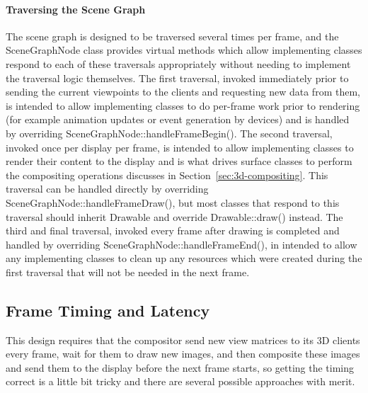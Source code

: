 \paragraph{Traversing the Scene Graph}

The scene graph is designed to be traversed several times per frame, and the SceneGraphNode class provides virtual methods which allow implementing classes respond to each of these traversals appropriately without needing to implement the traversal logic themselves. The first traversal, invoked immediately prior to sending the current viewpoints to the clients and requesting new data from them, is intended to allow implementing classes to do per-frame work prior to rendering (for example animation updates or event generation by devices) and is handled by overriding SceneGraphNode::handleFrameBegin(). The second traversal, invoked once per display per frame, is intended to allow implementing classes to render their content to the display and is what drives surface classes to perform the compositing operations discusses in Section~\ref{sec:3d-compositing}. This traversal can be handled directly by overriding SceneGraphNode::handleFrameDraw(), but most classes that respond to this traversal should inherit Drawable and override Drawable::draw() instead. The third and final traversal, invoked every frame after drawing is completed and handled by overriding SceneGraphNode::handleFrameEnd(), in intended to allow any implementing classes to clean up any resources which were created during the first traversal that will not be needed in the next frame.

\subsection{Frame Timing and Latency}

This design requires that the compositor send new view matrices to its 3D clients every frame, wait for them to draw new images, and then composite these images and send them to the display before the next frame starts, so getting the timing correct is a little bit tricky and there are several possible approaches with merit. 

